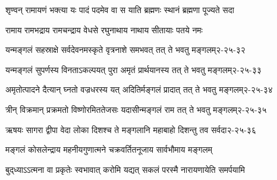 \twolineshloka
{शृण्वन् रामायणं भक्त्या यः पादं पदमेव वा}
{स याति ब्रह्मणः स्थानं ब्रह्मणा पूज्यते सदा}

\twolineshloka
{रामाय रामभद्राय रामचन्द्राय वेधसे}
{रघुनाथाय नाथाय सीतायाः पतये नमः}

\annotwolineshloka
{यन्मङ्गलं सहस्राक्षे सर्वदेवनमस्कृते}
{वृत्रनाशे समभवत् तत् ते भवतु मङ्गलम्}{२-२५-३२}

\annotwolineshloka
{यन्मङ्गलं सुपर्णस्य विनताऽकल्पयत् पुरा}
{अमृतं प्रार्थयानस्य तत् ते भवतु मङ्गलम्}{२-२५-३३}

\annotwolineshloka
{अमृतोत्पादने दैत्यान् घ्नतो वज्रधरस्य यत्}
{अदितिर्मङ्गलं प्रादात् तत् ते भवतु मङ्गलम्}{२-२५-३४}

\annotwolineshloka
{त्रीन् विक्रमान् प्रक्रमतो विष्णोरमिततेजसः}
{यदासीन्मङ्गलं राम तत् ते भवतु मङ्गलम्}{२-२५-३५}

\annotwolineshloka
{ऋषयः सागरा द्वीपा वेदा लोका दिशश्च ते}
{मङ्गलानि महाबाहो दिशन्तु तव सर्वदा}{२-२५-३६}

\twolineshloka
{मङ्गलं कोसलेन्द्राय महनीयगुणात्मने}
{चक्रवर्तितनूजाय सार्वभौमाय मङ्गलम्}

{बुद्‌ध्याऽऽत्मना वा प्रकृतेः स्वभावात्}
{करोमि यद्यत् सकलं परस्मै}
{नारायणायेति समर्पयामि}
